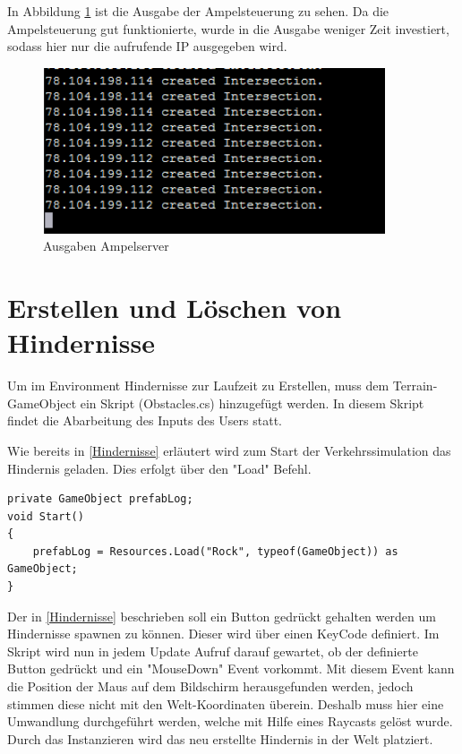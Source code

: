 In Abbildung \ref{img:ampel} ist die Ausgabe der Ampelsteuerung zu sehen. Da die Ampelsteuerung gut funktionierte, wurde in die Ausgabe weniger Zeit investiert, sodass hier nur die aufrufende IP ausgegeben wird.

\begin{figure}[H]
\begin{center}
	\includegraphics[width=0.9\textwidth]{BilderAllgemein/ampelserver.png}
\end{center}

	\caption{Ausgaben Ampelserver}

	\label{img:ampel}
\end{figure}



\section{Erstellen und Löschen von Hindernisse}

Um im Environment Hindernisse zur Laufzeit zu Erstellen, muss dem Terrain-GameObject ein Skript (Obstacles.cs) hinzugefügt werden. In diesem Skript findet die Abarbeitung des Inputs des Users statt.

Wie bereits in \ref{Hindernisse} erläutert wird zum Start der Verkehrssimulation das Hindernis geladen. Dies erfolgt über den "Load" Befehl.

\begin{lstlisting}[caption={Laden des Hindernisses},label={lst:Hinderniss_laden}]
private GameObject prefabLog;
void Start()
{
	prefabLog = Resources.Load("Rock", typeof(GameObject)) as GameObject;
}
\end{lstlisting}

Der in \ref{Hindernisse} beschrieben soll ein Button gedrückt gehalten werden um Hindernisse spawnen zu können. Dieser wird über einen KeyCode definiert. Im Skript wird nun in jedem Update Aufruf darauf gewartet, ob der definierte Button gedrückt und ein "MouseDown" Event vorkommt. Mit diesem Event kann die Position der Maus auf dem Bildschirm herausgefunden werden, jedoch stimmen diese nicht mit den Welt-Koordinaten überein. Deshalb muss hier eine Umwandlung durchgeführt werden, welche mit Hilfe eines Raycasts gelöst wurde. Durch das Instanzieren wird das neu erstellte Hindernis in der Welt platziert.

